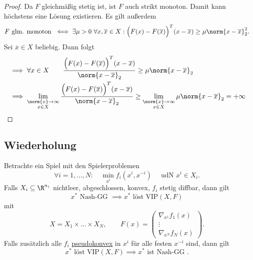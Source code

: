 \begin{proof}
	Da $F$ gleichmäßig stetig ist, ist $F$ auch strikt monoton. Damit kann höchstens eine Lösung existieren.
	Es gilt außerdem
	\[
		F \text{ glm. monoton } \iff \exists \mu  > 0~ \forall x,\overline{x} \in X : \Big( F(x) - F(\overline{x}) \Big) ^{T}(x-\overline{x}) \geq  \mu  \norm{x-\overline{x}}_{2} ^2
	.\] 
	Sei $\overline{x} \in X$ beliebig. Dann folgt
	\begin{align*}
	&\implies \forall x \in X \qquad \frac{\Big( F(x) - F(\overline{x}) \Big) ^{T}(x-\overline{x})}{\norm{x-\overline{x}} _{2}}\geq  \mu \norm{x-\overline{x}} _{2} \\
	&\implies \lim_{\substack{\norm{x}  \rightarrow \infty \\ x \in X}}  \frac{\Big( F(x) - F(\overline{x}) \Big) ^{T}(x-\overline{x})}{\norm{ x-\overline{x}} _{2}} \geq  \lim_{\substack{\norm{x} \rightarrow \infty \\ x \in X} }  \mu \norm{x -\overline{x}} _{2} = +\infty
	\end{align*}
\end{proof}

\begin{mdframed}
	\subsection*{Wiederholung}
	Betrachte ein Spiel mit den Spielerproblemen
	\[
		\forall i = 1, \ldots, N : \quad \min\limits_{x^{i}}f_{i}(x^{i}, x^{-i}) \quad \text{ udN }x^{i}\in X_{i}
	.\] 
	Falls $X_{i}\subseteq \R^{n_{i}}$ nichtleer, abgeschlossen, konvex, $f_{i}$ stetig diffbar, dann gilt
	\[
		{x}^{*} \text{ Nash-GG } \implies {x}^{*} \text{ löst VIP}(X,F)
	\] 
	mit
	\[
		X = X_1 \times  \ldots \times X_{N}, \qquad F(x) = \begin{pmatrix}
			\nabla _{x^{1}}f_{1}(x) \\
			\vdots \\
			\nabla _{x^{N}}f_{N}(x)
		\end{pmatrix}
	.\] 
	Falls zusätzlich alle $f_{i}$ \underline{pseudokonvex} in $x^{i}$ für alle festen $x^{-i}$ sind, dann gilt
	\[
		{x}^{*} \text{ löst VIP}(X,F) \implies {x}^{*} \text{ ist Nash-GG }
	.\] 
\end{mdframed}


